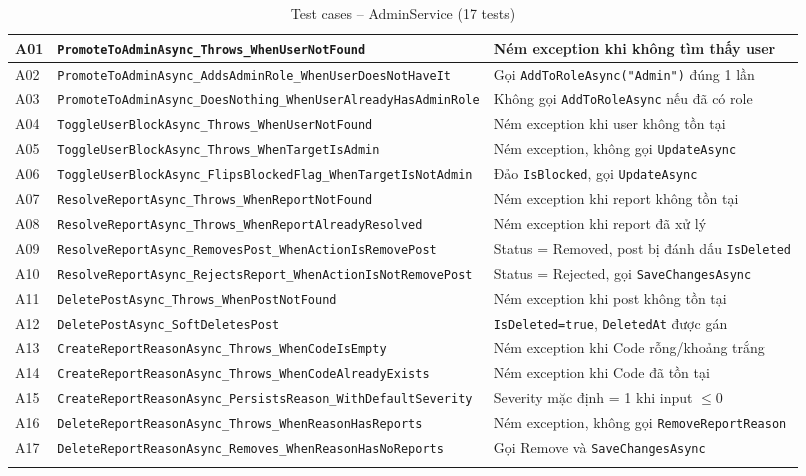 \documentclass[a4paper]{article}
\begin{document}
\begin{longtable}{|C{0.8cm}|L{5.4cm}|L{7.4cm}|}
A01 & \texttt{PromoteToAdminAsync\_Throws\_WhenUserNotFound} & Ném exception khi không tìm thấy user \\
\hline
A02 & \texttt{PromoteToAdminAsync\_AddsAdminRole\_WhenUserDoesNotHaveIt} & Gọi \texttt{AddToRoleAsync("Admin")} đúng 1 lần \\
\hline
{}
A03 & \texttt{PromoteToAdminAsync\_DoesNothing\_WhenUserAlreadyHasAdminRole} & Không gọi \texttt{AddToRoleAsync} nếu đã có role \\
\hline
A04 & \texttt{ToggleUserBlockAsync\_Throws\_WhenUserNotFound} & Ném exception khi user không tồn tại \\
\hline
{}
A05 & \texttt{ToggleUserBlockAsync\_Throws\_WhenTargetIsAdmin} & Ném exception, không gọi \texttt{UpdateAsync} \\
\hline
A06 & \texttt{ToggleUserBlockAsync\_FlipsBlockedFlag\_WhenTargetIsNotAdmin} & Đảo \texttt{IsBlocked}, gọi \texttt{UpdateAsync} \\
\hline
{}
A07 & \texttt{ResolveReportAsync\_Throws\_WhenReportNotFound} & Ném exception khi report không tồn tại \\
\hline
A08 & \texttt{ResolveReportAsync\_Throws\_WhenReportAlreadyResolved} & Ném exception khi report đã xử lý \\
\hline
{}
A09 & \texttt{ResolveReportAsync\_RemovesPost\_WhenActionIsRemovePost} & Status = Removed, post bị đánh dấu \texttt{IsDeleted} \\
\hline
A10 & \texttt{ResolveReportAsync\_RejectsReport\_WhenActionIsNotRemovePost} & Status = Rejected, gọi \texttt{SaveChangesAsync} \\
\hline
{}
A11 & \texttt{DeletePostAsync\_Throws\_WhenPostNotFound} & Ném exception khi post không tồn tại \\
\hline
A12 & \texttt{DeletePostAsync\_SoftDeletesPost} & \texttt{IsDeleted=true}, \texttt{DeletedAt} được gán \\
\hline
{}
A13 & \texttt{CreateReportReasonAsync\_Throws\_WhenCodeIsEmpty} & Ném exception khi Code rỗng/khoảng trắng \\
\hline
A14 & \texttt{CreateReportReasonAsync\_Throws\_WhenCodeAlreadyExists} & Ném exception khi Code đã tồn tại \\
\hline
{}
A15 & \texttt{CreateReportReasonAsync\_PersistsReason\_WithDefaultSeverity} & Severity mặc định = 1 khi input $\leq 0$ \\
\hline
A16 & \texttt{DeleteReportReasonAsync\_Throws\_WhenReasonHasReports} & Ném exception, không gọi \texttt{RemoveReportReason} \\
\hline
{}
A17 & \texttt{DeleteReportReasonAsync\_Removes\_WhenReasonHasNoReports} & Gọi Remove và \texttt{SaveChangesAsync} \\
\hline
\caption{Test cases -- AdminService (17 tests)}
\end{longtable}
\end{document}
